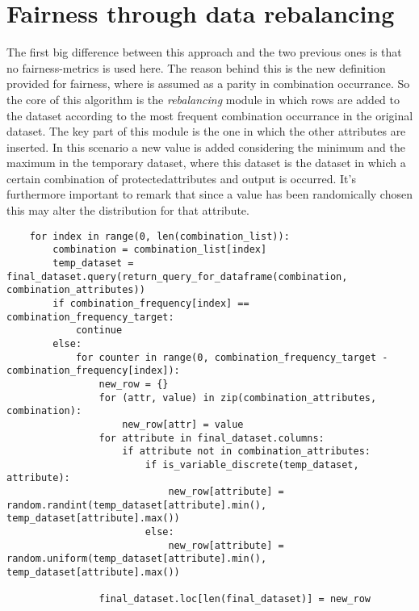 \documentclass[12pt,a4paper,openright,twoside]{book}
\begin{document}
\section{Fairness through data rebalancing}
The first big difference between this approach and the two previous ones is that no fairness-metrics is used here. The reason behind this is the new definition provided for fairness, where is assumed as a parity in combination occurrance. So the core of this algorithm is the \emph{rebalancing} module in which rows are added to the dataset according to the most frequent combination occurrance in the original dataset.
The key part of this module is the one in which the other attributes are inserted. In this scenario a new value is added considering the minimum and the maximum in the temporary dataset, where this dataset is the dataset in which a certain combination of protected\textunderscore attributes and output is occurred. It's furthermore important to remark that since a value has been  randomically chosen this may alter the distribution for that attribute.
\begin{lstlisting}
    for index in range(0, len(combination_list)):
        combination = combination_list[index]
        temp_dataset = final_dataset.query(return_query_for_dataframe(combination, combination_attributes))
        if combination_frequency[index] == combination_frequency_target:
            continue
        else:
            for counter in range(0, combination_frequency_target - combination_frequency[index]):
                new_row = {}
                for (attr, value) in zip(combination_attributes, combination):
                    new_row[attr] = value
                for attribute in final_dataset.columns:
                    if attribute not in combination_attributes:
                        if is_variable_discrete(temp_dataset, attribute):
                            new_row[attribute] = random.randint(temp_dataset[attribute].min(), temp_dataset[attribute].max())
                        else:
                            new_row[attribute] = random.uniform(temp_dataset[attribute].min(), temp_dataset[attribute].max())
                
                final_dataset.loc[len(final_dataset)] = new_row

\end{lstlisting}
\end{document}
